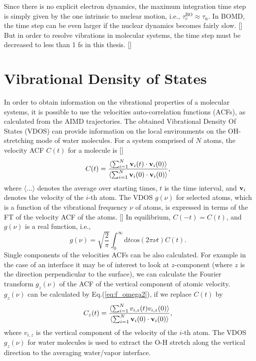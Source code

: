 Since there is no explicit electron dynamics, the maximum integration time step is simply given by the one intrinsic 
to nuclear motion, i.e., $\tau_{e}^{\text{BO}}\approx\tau_{\text{n}}$. 
In BOMD, the time step can be even larger if the nuclear dynamics becomes fairly slow. [\cite{GK93}] 
But in order to resolve vibrations in molecular systems, the time step must be decreased to less than 1 fs in this thesis. [\cite{DM00}]
%
\section{Vibrational Density of States}\label{section_VDOS}
In order to obtain information on the vibrational properties of a molecular systems, it is possible to use the velocities auto-correlation functions (ACFs),
as calculated from the AIMD trajectories.
The obtained Vibrational Density Of States (VDOS) can 
provide information on the local environments on the OH-stretching mode of water molecules. 
For a system comprised of $N$ atoms, the velocity ACF $C(t)$ for a molecule is [\cite{MTD,JMD,TI07}] 
\begin{equation}
C(t)=\frac{\langle\sum^{N}_{i=1}{\bf{v}}_i(t)\cdot{\bf{v}}_i(0)\rangle}{\langle\sum^{N}_{i=1}{\bf{v}}_i(0)\cdot{\bf{v}}_i(0)\rangle},
\label{eq:Ct3s}
\end{equation}
where $\langle\dots\rangle$ denotes the average over starting times, $t$ is the time interval, and ${\bf{v}}_i$ denotes 
the velocity of the $i$-th atom. The VDOS $g(\nu)$ for selected atoms, which is a function of the vibrational frequency $\nu$ 
of atoms, is expressed in terms of the FT of the velocity ACF of the atoms. [\cite{MPA86}]
In equilibrium, $C(-t)=C(t)$, and $g(\nu)$ is a real function, i.e., 
\begin{equation}
g(\nu)= \sqrt{\frac{2}{\pi}}\int^{\infty}_{0}\text{d}t \text{cos}(2\pi\nu{t})C(t).
\label{eq:f_omega2}
\end{equation}
Single components of the velocities ACFs can be also calculated. For example in the case of an interface it may be of interest to look at 
$z$-component (where $z$ is the direction perpendicular to the surface),
we can calculate the Fourier transform $g_z(\nu)$ of the ACF of the vertical component of atomic velocity. 
$g_z(\nu)$ can be calculated by Eq.\thinspace(\ref{eq:f_omega2}), if we replace $C(t)$ by 
\begin{equation}
C_z(t)=\frac{\langle\sum^{N}_{i=1}{v_{i,z}(t){v_{i,z}(0)\rangle}}}{\langle\sum^{N}_{i=1}{\bf{v}}_i(0)\cdot{\bf{v}}_i(0)\rangle},
\label{eq:ACN}
\end{equation}
where $v_{i,z}$ is the vertical component of the velocity of the $i$-th atom.
The VDOS $g_z(\nu)$ for water molecules is used to extract the O-H stretch along the vertical direction to the averaging water/vapor interface. 

